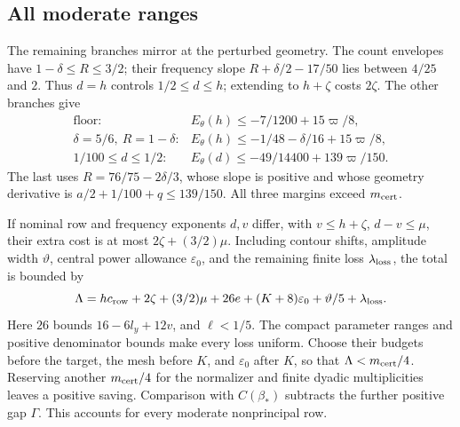 \subsection{All moderate ranges}

The remaining branches mirror \cite[(20.5), (20.7) and (20.11)]{OAI26}
at the perturbed geometry. The count envelopes have \(1-\delta\le R\le3/2\); their frequency
slope \(R+\delta/2-17/50\) lies between \(4/25\) and \(2\).
Thus \(d=h\) controls \(1/2\le d\le h\); extending to \(h+\zeta\)
costs \(2\zeta\). The other branches give
\[
\begin{array}{ll}
 \text{floor:}&E_\theta(h)\le-7/1200+15\varpi/8,\\
 \delta=5/6,\ R=1-\delta:
   &E_\theta(h)\le-1/48-\delta/16+15\varpi/8,\\
 1/100\le d\le1/2:
   &E_\theta(d)\le-49/14400+139\varpi/150 .
\end{array}
\]
The last uses \(R=76/75-2\delta/3\), whose slope is positive
and whose geometry derivative is \(a/2+1/100+q\le139/150\).
All three margins exceed \(m_{\rm cert}\).

If nominal row and frequency exponents \(d,v\) differ, with
\(v\le h+\zeta\), \(d-v\le\mu\), their extra cost is at most
\(2\zeta+(3/2)\mu\). Including contour shifts, amplitude width
\(\vartheta\), central power allowance \(\varepsilon_0\), and
the remaining finite loss \(\lambda_{\rm loss}\), the total is bounded by
\begin{equation}\label{gex:central-loss-budget}
 \Lambda=h c_{\rm row}+2\zeta+(3/2)\mu+
          26e+(K+8)\varepsilon_0+\vartheta/5+\lambda_{\rm loss} .
\end{equation}
Here \(26\) bounds \(16-6l_y+12v\), and \(\ell<1/5\).
The compact parameter ranges and positive denominator bounds make
every loss uniform. Choose their budgets before the target,
the mesh before \(K\), and \(\varepsilon_0\) after \(K\), so that
\(\Lambda<m_{\rm cert}/4\). Reserving another \(m_{\rm cert}/4\) for the normalizer
and finite dyadic multiplicities leaves a positive saving.
Comparison with \(C(\beta_*)\) subtracts the further positive gap
\(\Gamma\). This accounts for every moderate nonprincipal row.
